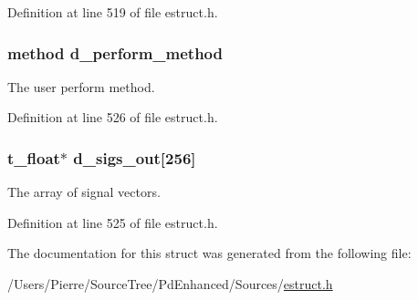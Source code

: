 Definition at line 519 of file estruct.\-h.

\hypertarget{struct__edspbox_ae13acca7c0f073f1030545ce368e6e03}{
\subsubsection[{d\-\_\-perform\-\_\-method}]{\setlength{\rightskip}{0pt plus 5cm}method d\-\_\-perform\-\_\-method}}\label{struct__edspbox_ae13acca7c0f073f1030545ce368e6e03}
The user perform method. 

Definition at line 526 of file estruct.\-h.

\hypertarget{struct__edspbox_aebb3e36050cca90ec2bbfc8226198ca8}{
\subsubsection[{d\-\_\-sigs\-\_\-out}]{\setlength{\rightskip}{0pt plus 5cm}t\-\_\-float$\ast$ d\-\_\-sigs\-\_\-out\mbox{[}256\mbox{]}}}\label{struct__edspbox_aebb3e36050cca90ec2bbfc8226198ca8}
The array of signal vectors. 

Definition at line 525 of file estruct.\-h.



The documentation for this struct was generated from the following file\-:\begin{DoxyCompactItemize}
\item 
/\-Users/\-Pierre/\-Source\-Tree/\-Pd\-Enhanced/\-Sources/\hyperlink{estruct_8h}{estruct.\-h}\end{DoxyCompactItemize}
